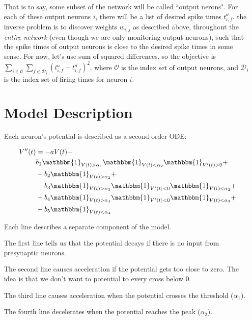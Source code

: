 \documentclass[a4paper]{article}
\begin{document}
That is to say, some subset of the network will be called ``output nerons". For each of these output neurons $i$, there will be a list of desired spike times $t^d_{i,f}$. the inverse problem is to discover weights $w_{i,j}$ as described above, throughout the \textit{entire network} (even though we are only monitoring output neurons), such that the spike times of output neurons is close to the desired spike times in some sense. For now, let's use sum of squared differences, so the objective is $\sum_{i \in \mathcal{O}} \sum_{f \in \mathcal{D}_i} (t^a_{i,f} - t^d_{i,f})^2$, where $\mathcal{O}$ is the index set of output neurons, and $\mathcal{D}_i$ is the index set of firing times for neuron $i$. 

\section{Model Description}

Each neuron's potential is described as a second order ODE:

\begin{equation} \label{eq1}
\begin{split}
V''(t) & = -aV(t) + \\
 & b_1 \mathbbm{1}_{V(t) > \alpha_1}\mathbbm{1}_{V(t) < \alpha_2}\mathbbm{1}_{V'(t) > 0} + \\
& -b_2 \mathbbm{1}_{V(t) > \alpha_2} + \\
& -b_3 \mathbbm{1}_{V(t) > \alpha_3} \mathbbm{1}_{V'(t) < 0} \mathbbm{1}_{V(t) < \alpha_2} + \\
& -b_4 \mathbbm{1}_{V(t) > \alpha_1} \mathbbm{1}_{V'(t) < 0} \mathbbm{1}_{V(t) < \alpha_3} + \\
& -b_5 \mathbbm{1}_{V(t) < \alpha_4} 
\end{split}
\end{equation}

Each line describes a separate component of the model. 

The first line tells us that the potential decays if there is no input from presynaptic neurons.

The second line causes acceleration if the potential gets too close to zero. The idea is that we don't want to potential to every cross below 0.

The third line causes acceleration when the potential crosses the threshold ($\alpha_1$).

The fourth line decelerates when the potential reaches the peak ($\alpha_2$).
\end{document}
